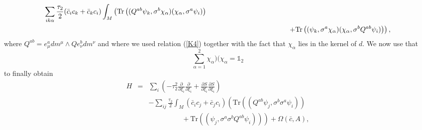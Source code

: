 \documentclass[12pt]{article}
\newcommand{\nn}{\nonumber}
\def\a{\alpha}
\def\m{\mu}
\def\n{\nu}
\def\OO{\Omega}
\newcommand{\pa}{\partial}
\begin{document}
\begin{eqnarray}
\sum_{ik\a} \frac{\tau_2}{2}  ( \bar{c}_i   {c}_{k} +  \bar{c}_k  {c}_{i} )
 \int_M \left( 
  \mbox{Tr} \left(            (Q^{ab}\psi_k,  \sigma^b \chi_\a)     (\chi_\a, \sigma^a \psi_i)  \right) 
\right.\nn\\&&\left.
\hspace{3,8cm}+  \mbox{Tr} \left(         (\psi_k,  \sigma^a \chi_\a)   (\chi_\a, \sigma^b Q ^{ab} \psi_i)   \right)
 \right) ,
\label{startrek}
\end{eqnarray}
where $Q^{ab}= e^a_\m  dm^\m \wedge  Q   e^b_\n dm^\n$ and
where we used relation (\ref{K4}) together with the fact that $\chi_\a$ lies in the kernel of $d$. We now use that
\begin{equation}
\sum_{\a=1}^2 \chi_\a )( \chi_\a = \mathds{1}_2
\label{coronaxxx}
\end{equation}
to finally obtain 
\begin{eqnarray}
H &=&  \sum_{i}    \left(  -\tau_2^2     \frac{\pa}{\pa\xi_{i }}  \frac{\pa}{\pa\xi_{i }}    
+  \frac{\pa S}{\pa \xi_i}\frac{\pa S}{\pa \xi_i}  \right)
\nn\\&&
- \sum_{ij} \frac{\tau_2}{2}      \int_M \left( \bar{c}_i   {c}_{j} + \bar{c}_j   {c}_{i}  \right)  
\left( \mbox{Tr} \left(    (Q^{ab}\psi_j,  \sigma^b \sigma^a \psi_i)  \right) 
\right. \nn\\ &&\left.\hspace{2cm}
+  \mbox{Tr} \left(     (\psi_j,  \sigma^a  \sigma^b Q ^{ab} \psi_i)   \right) \right)
+  \OO(\bar{c}, A),
\label{b222}
\end{eqnarray}
\end{document}
